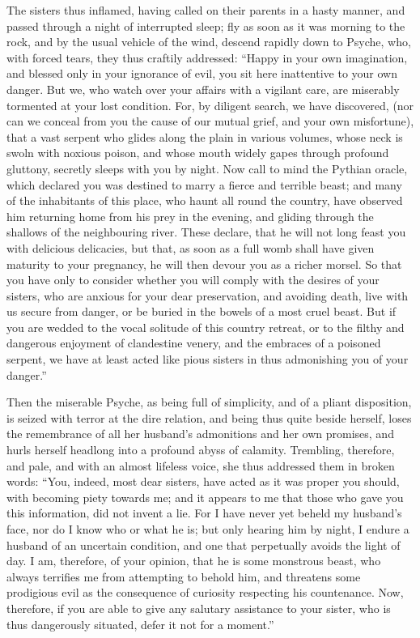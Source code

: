 \documentclass{article}
\begin{document}
The sisters thus inflamed, having called on their parents in a hasty manner,
and passed through a night of interrupted sleep; fly as soon as it was morning
to the rock, and by the usual vehicle of the wind, descend rapidly down to
Psyche, who, with forced tears, they thus craftily addressed: ``Happy in your
own imagination, and blessed only in your ignorance of evil, you sit here
inattentive to your own danger. But we, who watch over your affairs with a
vigilant care, are miserably tormented at your lost condition. For, by diligent
search, we have discovered, (nor can we conceal from you the cause of our
mutual grief, and your own misfortune), that a vast serpent who glides along
the plain in various volumes, whose neck is swoln with noxious poison, and
whose mouth widely gapes through profound gluttony, secretly sleeps with you by
night. Now call to mind the Pythian oracle, which declared you was destined to
marry a fierce and terrible beast; and many of the inhabitants of this place,
who haunt all round the country, have observed him returning home from his prey
in the evening, and gliding through the shallows of the neighbouring river.
These declare, that he will not long feast you with delicious delicacies, but
that, as soon as a full womb shall have given maturity to your pregnancy, he
will then devour you as a richer morsel. So that you have only to consider
whether you will comply with the desires of your sisters, who are anxious for
your dear preservation, and avoiding death, live with us secure from danger, or
be buried in the bowels of a most cruel beast. But if you are wedded to the
vocal solitude of this country retreat, or to the filthy and dangerous
enjoyment of clandestine venery, and the embraces of a poisoned serpent, we
have at least acted like pious sisters in thus admonishing you of your
danger.''

Then the miserable Psyche, as being full of simplicity, and of a pliant
disposition, is seized with terror at the dire relation, and being thus quite
beside herself, loses the remembrance of all her husband's admonitions and her
own promises, and hurls herself headlong into a profound abyss of calamity.
Trembling, therefore, and pale, and with an almost lifeless voice, she thus
addressed them in broken words: ``You, indeed, most dear sisters, have acted as
it was proper you should, with becoming piety towards me; and it appears to me
that those who gave you this information, did not invent a lie. For I have
never yet beheld my husband's face, nor do I know who or what he is; but only
hearing him by night, I endure a husband of an uncertain condition, and one
that perpetually avoids the light of day. I am, therefore, of your opinion,
that he is some monstrous beast, who always terrifies me from attempting to
behold him, and threatens some prodigious evil as the consequence of curiosity
respecting his countenance. Now, therefore, if you are able to give any
salutary assistance to your sister, who is thus dangerously situated, defer it
not for a moment.''
\end{document}
